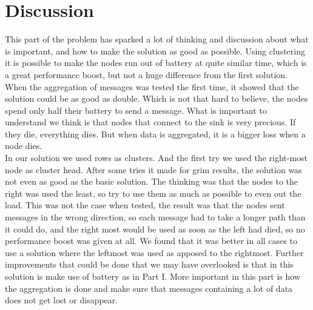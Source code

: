 \documentclass{article}
\begin{document}
  \section{Discussion}
  This part of the problem has sparked a lot of thinking and discussion about what
  is important, and how to make the solution as good as possible. Using clustering 
  it is possible to make the nodes run out of battery at quite similar time, which
  is a great performance boost, but not a huge difference from the first solution.
  When the aggregation of messages was tested the first time, it showed that the
  solution could be as good as double. Which is not that hard to believe, the nodes
  spend only half their battery to send a message. What is important to understand
  we think is that nodes that connect to the sink is very precious. If they die, 
  everything dies. But when data is aggregated, it is a bigger loss when a node
  dies.\\
  In our solution we used rows as clusters. And the first try we used the right-most
  node as cluster head. After some tries it made for grim results, the solution 
  was not even as good as the basic solution. The thinking was that the nodes
  to the right was used the least, so try to use them as much as possible to
  even out the load. This was not the case when tested, the result was that
  the nodes sent messages in the wrong direction, so each message had to take a 
  longer path than it could do, and the right most would be used as soon as the
  left had died, so no performance boost was given at all. We found that it
  was better in all cases to use a solution where the leftmost
  was used as apposed to the rightmost. Further improvements that could be done
  that we may have overlooked is that in this solution is make use of battery
  as in Part I. More important in this part is how the aggregation is done
  and make sure that messages containing a lot of data does not get lost or
  disappear. 

  
\end{document}
